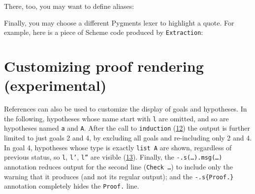 \documentclass[a4paper]{article}
\begin{document}
There, too, you may want to define aliases:

\begin{quote}
\begin{alectryon}
\end{alectryon}

\begin{alectryon}
\end{alectryon}
\end{quote}

Finally, you may choose a different Pygments lexer to highlight a quote.  For example, here is a piece of Scheme code produced by \texttt{Extraction}:

\begin{quote}
\begin{alectryon}
  \begin{\al{message}}
  \end{\al{message}}
\end{alectryon}
\end{quote}


\section{Customizing proof rendering (\textbf{experimental})%
  \label{customizing-proof-rendering-experimental}%
}

References can also be used to customize the display of goals and hypotheses.  In the following, hypotheses whose name start with \texttt{l} are omitted, and so are hypotheses named \texttt{a} and \texttt{A}.  After the call to \texttt{induction} (\hyperref[references-rst-io-pr-s-induction-1-0]{12}) the output is further limited to just goals 2 and 4, by excluding all goals and re-including only 2 and 4.  In goal 4, hypotheses whose type is exactly \texttt{list A} are shown, regardless of previous status, so \texttt{l}, \texttt{l'}, \texttt{l''} are visible (\hyperref[references-rst-io-pr-s-induction-1-g-4-h-l-0]{13}).  Finally, the \texttt{-.s(…).msg(…)} annotation reduces output for the second line (\texttt{Check …}) to include only the warning that it produces (and not its regular output); and the \texttt{-.s\{Proof.\}} annotation completely hides the \texttt{Proof.} line.
\end{document}
